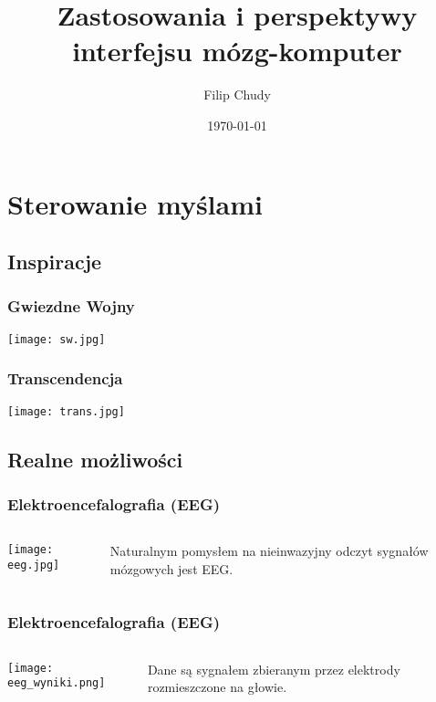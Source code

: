 \documentclass{beamer}
\begin{document}
\title{Zastosowania i perspektywy interfejsu mózg-komputer}
\author{Filip Chudy}
\date{\today} 


\begin{frame}
\titlepage
\end{frame}


\section{Sterowanie myślami}

\subsection{Inspiracje}
\begin{frame} \frametitle{Gwiezdne Wojny}
\texttt{[image: sw.jpg]}
\end{frame}

\begin{frame} \frametitle{Transcendencja}
\texttt{[image: trans.jpg]}
\end{frame}

\subsection{Realne możliwości}
\begin{frame} \frametitle{Elektroencefalografia (EEG)}
\begin{columns}
\begin{column}{5cm}
\texttt{[image: eeg.jpg]}
\end{column}
\begin{column}{5cm}
Naturalnym pomysłem na nieinwazyjny odczyt sygnałów mózgowych jest EEG.
\end{column}
\end{columns}
\end{frame}

\begin{frame} \frametitle{Elektroencefalografia (EEG)}
\begin{columns}
\begin{column}{5cm}
\texttt{[image: eeg\_wyniki.png]}
\end{column}
\begin{column}{5cm}
Dane są sygnałem zbieranym przez elektrody rozmieszczone na głowie.
\end{column}
\end{columns}
\end{frame}
\end{document}
